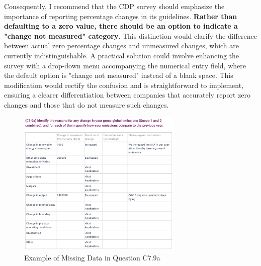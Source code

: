 Consequently, I recommend that the CDP survey should emphasize the importance of reporting percentage changes in its guidelines. \textbf{Rather than defaulting to a zero value, there should be an option to indicate a "change not measured" category}. This distinction would clarify the difference between actual zero percentage changes and unmeasured changes, which are currently indistinguishable. A practical solution could involve enhancing the survey with a drop-down menu accompanying the numerical entry field, where the default option is "change not measured" instead of a blank space. This modification would rectify the confusion and is straightforward to implement, ensuring a clearer differentiation between companies that accurately report zero changes and those that do not measure such changes.


\begin{figure}[H]
    \centering
    \includegraphics[width=0.7\textwidth]{thesis_tex/figures/cdp_missing.png}
    \caption{Example of Missing Data in Question C7.9a}
    \label{fig:missing_data}
\end{figure}







